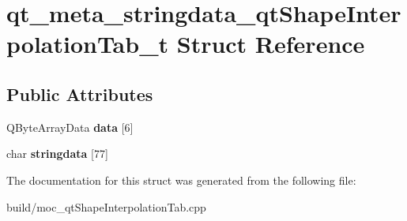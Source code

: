 \hypertarget{structqt__meta__stringdata__qt_shape_interpolation_tab__t}{}\section{qt\+\_\+meta\+\_\+stringdata\+\_\+qt\+Shape\+Interpolation\+Tab\+\_\+t Struct Reference}
\label{structqt__meta__stringdata__qt_shape_interpolation_tab__t}
\subsection*{Public Attributes}
\begin{DoxyCompactItemize}
\item 
\hypertarget{structqt__meta__stringdata__qt_shape_interpolation_tab__t_a710c4a19f94536db6288d9b475078598}{}Q\+Byte\+Array\+Data {\bfseries data} \mbox{[}6\mbox{]}\label{structqt__meta__stringdata__qt_shape_interpolation_tab__t_a710c4a19f94536db6288d9b475078598}

\item 
\hypertarget{structqt__meta__stringdata__qt_shape_interpolation_tab__t_ab275cf5483f2a2b2eb8435d9e80e85ec}{}char {\bfseries stringdata} \mbox{[}77\mbox{]}\label{structqt__meta__stringdata__qt_shape_interpolation_tab__t_ab275cf5483f2a2b2eb8435d9e80e85ec}

\end{DoxyCompactItemize}


The documentation for this struct was generated from the following file\+:\begin{DoxyCompactItemize}
\item 
build/moc\+\_\+qt\+Shape\+Interpolation\+Tab.\+cpp\end{DoxyCompactItemize}
